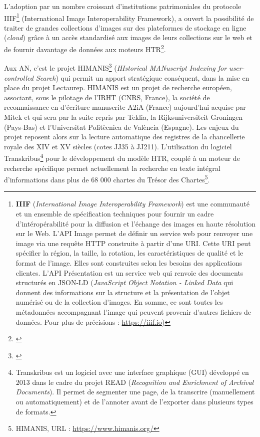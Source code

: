 L'adoption par un nombre croissant d’institutions patrimoniales du protocole IIIF\footnote{\textbf{IIIF} (\textit{International Image Interoperability Framework}) est une communauté et un ensemble de spécification techniques pour fournir un cadre d'intéropérabilité pour la diffusion et l'échange des images en haute résolution sur le Web. L'API Image permet de définir un service web pour renvoyer une image via une requête HTTP construite à partir d'une URI. Cette URI peut spécifier la région, la taille, la rotation, les caractéristiques de qualité et le format de l'image. Elles sont construites selon les besoins des applications clientes. L'API Présentation est un service web qui renvoie des documents structurés en JSON-LD (\textit{JavaScript Object Notation - Linked Data} qui donnent des informations sur la structure et la présentation de l'objet numérisé ou de la collection d'images. En somme, ce sont toutes les métadonnées accompagnant l'image qui peuvent provenir d'autres fichiers de données. Pour plus de précisions : \url{https://iiif.io})} (International Image Interoperability Framework), a ouvert la possibilité de traiter de grandes collections d’images sur des plateformes de stockage en ligne (\textit{cloud}) grâce à un accès standardisé aux images de leurs collections sur le web et de fournir davantage de données aux moteurs HTR\footnote{\cite{boros_automatic_2019}}.

Aux AN, c'est le projet HIMANIS\footnote{\cite{hamel_recherche_2017}} (\textit{HIstorical MANuscript Indexing for user-controlled Search}) qui permit un apport stratégique conséquent, dans la mise en place du projet Lectaurep. HIMANIS est un projet de recherche européen, associant, sous le pilotage de l'IRHT (CNRS, France), la société de reconnaissance en d'écriture manuscrite A2iA (France) aujourd'hui acquise par Mitek et qui sera par la suite repris par Teklia, la Rijksuniversiteit Groningen (Pays-Bas) et l'Universitat Politècnica de València (Espagne). Les enjeux du projet reposent alors sur la lecture automatique des registres de la chancellerie royale des XIV et XV siècles (cotes JJ35 à JJ211). L'utilisation du logiciel Transkribus\footnote{Transkribus est un logiciel avec une interface graphique (GUI) développé en 2013 dans le cadre du projet READ (\textit{Recognition and Enrichment of Archival Documents}). Il permet de segmenter une page, de la transcrire (manuellement ou automatiquement) et de l'annoter avant de l’exporter dans plusieurs types de formats.} pour le développement du modèle HTR, couplé à un moteur de recherche spécifique permet actuellement la recherche en texte intégral d'informations dans plus de 68 000 chartes du Trésor des Chartes\footnote{HIMANIS, URL : \url{https://www.himanis.org/}}. 

